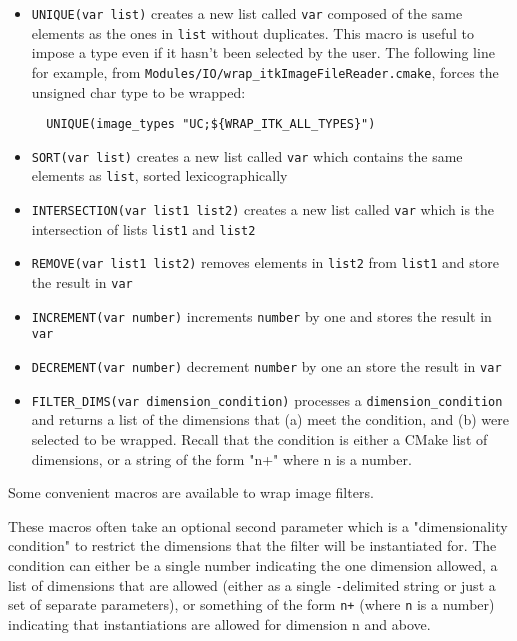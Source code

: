 \documentclass{InsightArticle}
\begin{document}
\begin{itemize}
  \item \verb$UNIQUE(var list)$ creates a new list called \verb$var$ composed of the same
elements as the ones in \verb$list$ without duplicates. This macro is useful to impose
a type even if it hasn't been selected by the user. The following line for example, from
\verb$Modules/IO/wrap_itkImageFileReader.cmake$, forces the unsigned char type to be
wrapped:

\small \begin{verbatim}
  UNIQUE(image_types "UC;${WRAP_ITK_ALL_TYPES}")
\end{verbatim} \normalsize

  \item \verb$SORT(var list)$ creates a new list called \verb$var$ which contains the
same elements as \verb$list$, sorted lexicographically

  \item \verb$INTERSECTION(var list1 list2)$ creates a new list called \verb$var$ which
is the intersection of lists \verb$list1$ and \verb$list2$

  \item \verb$REMOVE(var list1 list2)$ removes elements in \verb$list2$ from \verb$list1$
and store the result in \verb$var$

  \item \verb$INCREMENT(var number)$ increments \verb$number$ by one and stores the result
in \verb$var$

  \item \verb$DECREMENT(var number)$ decrement \verb$number$ by one an store the result
in \verb$var$

  \item \verb$FILTER_DIMS(var dimension_condition)$ processes a \verb$dimension_condition$
and returns a list of the dimensions that (a) meet the condition, and (b) were selected
to be wrapped. Recall that the condition is either a CMake list of dimensions, or a
string of the form "n+" where n is a number.

\end{itemize}


Some convenient macros are available to wrap image filters.

These macros often take an optional second parameter which is a "dimensionality
condition" to restrict the dimensions that the filter will be instantiated
for. The condition can either be a single number indicating the one dimension
allowed, a list of dimensions that are allowed (either as a single \verb$-$delimited
string or just a set of separate parameters), or something of the form \verb$n+$
(where \verb$n$ is a number) indicating that instantiations are allowed for dimension
n and above.
\end{document}
